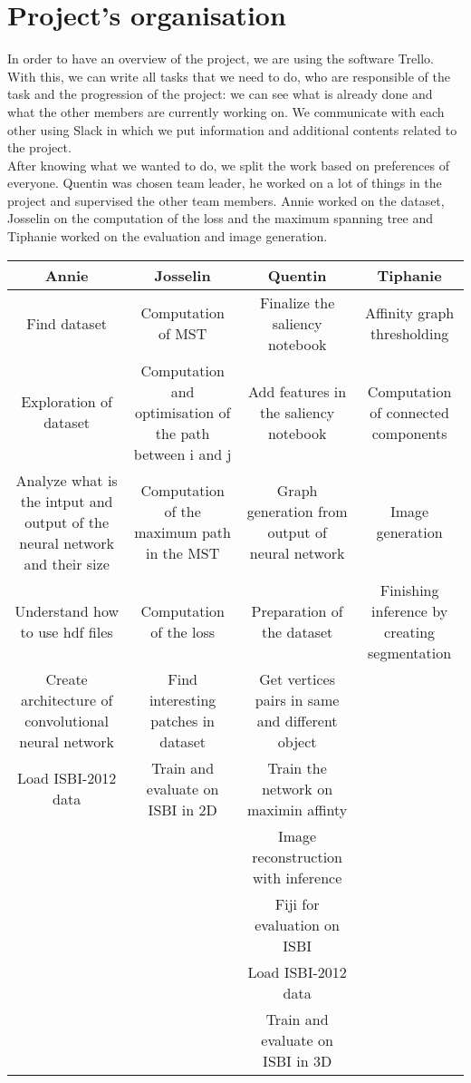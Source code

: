 \documentclass{article}
\begin{document}
\section{Project’s organisation}

In order to have an overview of the project, we are using the software Trello. With this, we can write all tasks that we need to do, who are responsible of the task and the progression of the project: we can see what is already done and what the other members are currently working on. We communicate with each other using Slack in which we put information and additional contents related to the project. \\
After knowing what we wanted to do, we split the work based on preferences of everyone. Quentin was chosen team leader, he worked on a lot of things in the project and supervised the other team members. Annie worked on the dataset, Josselin on the computation of the loss and the maximum spanning tree and Tiphanie worked on the evaluation and image generation. \\

\begin{center}
\begin{tabular}{ |c|c|c|c| } 
 \hline
 Annie & Josselin & Quentin & Tiphanie \\
 \hline
 Find dataset & Computation of MST & Finalize the saliency notebook & Affinity graph thresholding \\ 
 \hline
 Exploration of dataset & Computation and optimisation of the path between i and j & Add features in the saliency notebook & Computation of connected components \\ 
 \hline
 Analyze what is the intput and output of the neural network and their size & Computation of the maximum path in the MST & Graph generation from output of neural network & Image generation \\ 
 \hline
 Understand how to use hdf files & Computation of the loss & Preparation of the dataset & Finishing inference by creating segmentation \\
 \hline
 Create architecture of convolutional neural network & Find interesting patches in dataset & Get vertices pairs in same and different object & \\
 \hline
 Load ISBI-2012 data & Train and evaluate on ISBI in 2D & Train the network on maximin affinty & \\
 \hline
  & & Image reconstruction with inference & \\
 \hline
  & & Fiji for evaluation on ISBI & \\
 \hline
  & & Load ISBI-2012 data & \\
 \hline
 & & Train and evaluate on ISBI in 3D & \\

 \hline
\end{tabular}
\end{center}
\end{document}
